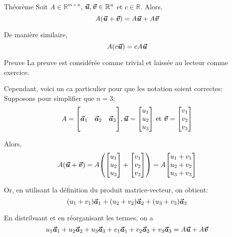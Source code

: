 \documentclass{article}
\begin{document}
\begin{parag}{Théorème}
    Soit $A \in \mathbb{R}^{m\times n}$, $\bm{\protect\vec{u}}, \bm{\protect\vec{v}} \in \mathbb{R}^{n}$ et $c \in \mathbb{R}$. Alors,
    \[A \left( \bvec{u} + \bvec{v}\right) = A \bvec{u} + A \bvec{v}\]

    De manière similaire,
    \[A\left(c \bvec{u}\right) = c A \bvec{u}\]

    \begin{subparag}{Preuve}
        La preuve est considérée comme trivial et laissée au lecteur comme exercice.

        Cependant, voici un ca particulier pour que les notation soient correctes: Supposons pour simplifier que $n = 3$:
        \[A = \begin{bmatrix}  &  &  \\ \bvec{a}_1 & \bvec{a}_2 & \bvec{a}_3 \\  &  &  \end{bmatrix} , \bvec{u} = \begin{bmatrix} u_1 \\ u_2 \\ u_3 \end{bmatrix} \text{ et } \bvec{v} = \begin{bmatrix} v_1 \\ v_2 \\ v_3 \end{bmatrix} \]

        Alors,
        \[A\left(\bvec{u} + \bvec{v}\right) = A \left( \begin{bmatrix} u_1 \\ u_2 \\ u_3 \end{bmatrix} + \begin{bmatrix} v_1 \\ v_2 \\ v_3 \end{bmatrix}\right) = A \begin{bmatrix} u_1 + v_1 \\ u_2 + v_2 \\ u_3 + v_3 \end{bmatrix} \]

        Or, en utilisant la définition du produit matrice-vecteur, on obtient:
        \[\left(u_1 + v_1\right) \bvec{a}_1 + \left(u_2 + v_2\right) \bvec{a}_2 + \left(u_3 + v_3\right) \bvec{a}_3\]

        En distribuant et en réorganisant les termes, on a
        \[u_1 \bm{\protect\vec{a}}_1 + u_2 \bm{\protect\vec{a}}_2 + u_3 \bm{\protect\vec{a}}_3 + v_1 \bm{\protect\vec{a}}_1 + v_2 \bm{\protect\vec{a}}_2 + v_3 \bm{\protect\vec{a}}_3 = A \bm{\protect\vec{u}} + A \bm{\protect\vec{v}}\]

    \end{subparag}

\end{parag}
\end{document}
